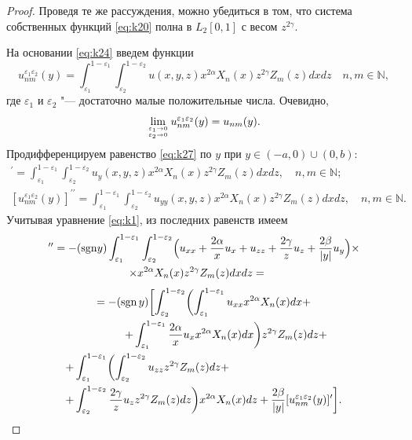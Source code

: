 \begin{proof}
	Проведя те же рассуждения, можно убедиться в том, что система собственных функций \eqref{eq:k20} полна в $L_2[0,1]$ с весом $z^{2\gamma}.$

	На основании \eqref{eq:k24} введем функции
\begin{equation}
u_{nm}^{\varepsilon_1\varepsilon_2}(y)=\int_{\varepsilon_1}^{1-\varepsilon_1}{\int_{\varepsilon_2 }^{1-\varepsilon_2}{u(x,y,z)x^{2\alpha}X_n(x)z^{2\gamma}Z_m(z)dxdz}} \quad n,m \in \mathbb N,
\label{eq:k27}
\end{equation}
где $\varepsilon_1$ и $\varepsilon_2$ "--- достаточно малые положительные числа.
Очевидно, 
\begin{equation}
\lim\limits_{\varepsilon_1\to0 \atop \varepsilon_2\to0}u_{nm}^{\varepsilon_1\varepsilon_2}(y)=u_{nm}(y).
\label{eq:k28}
\end{equation}
Продифференцируем равенство \eqref{eq:k27} по $y$ при $y\in(-a,0)\cup(0,b)$:
\begin{gather*}
[u_{nm}^{\varepsilon_1\varepsilon_2}(y)]^\prime=\int_{\varepsilon_1}^{1-\varepsilon_1} {\int_{\varepsilon_2}^{1-\varepsilon_2}{u_y(x,y,z)x^{2\alpha}X_n(x)z^{2\gamma}Z_m(z)dxdz}}, \quad n,m \in \mathbb N;
\\
[u_{nm}^{\varepsilon_1\varepsilon_2}(y)]^{\prime\prime}=\int_{\varepsilon_1}^{1-\varepsilon_1} {\int_{\varepsilon_2}^{1-\varepsilon_2}{u_{yy}(x,y,z)x^{2\alpha}X_n(x)z^{2\gamma}Z_m(z)dxdz}}, \quad n,m \in \mathbb N.
\end{gather*}
Учитывая уравнение \eqref{eq:k1}, из последних равенств имеем
\begin{multline}
[u_{nm}^{\varepsilon_1\varepsilon_2}(y)]^{\prime\prime}=
-({\rm sgn}y)
\int_{\varepsilon_1}^{1-\varepsilon_1}
\int_{\varepsilon_2}^{1-\varepsilon_2}
\Bigl(u_{xx}+\frac{2\alpha}{x}u_x+u_{zz}+\frac{2\gamma}{z}u_z+\frac{2\beta}{|y|}u_y\Bigr)\times
\\ 
\times x^{2\alpha}X_n(x)z^{2\gamma}Z_m(z)dxdz=~~~~
\end{multline} \newpage
\begin{multline}
=-(\mathop{\rm sgn}y)
\biggl[ \int_{\varepsilon_2}^{1-\varepsilon_2}
\biggl(\int_{\varepsilon_1}^{1-\varepsilon_1}u_{xx}x^{2\alpha}X_n(x)dx+
\\
\hfill
+ \int_{\varepsilon_1}^{1-\varepsilon_1}
\frac{2\alpha}{x}u_x x^{2\alpha}X_n(x)dx\biggr) z^{2\gamma} Z_m(z)dz+~~~~
\\
+\int_{\varepsilon_1}^{1-\varepsilon_1}
\biggl(\int_{\varepsilon_2}^{1-\varepsilon_2}
u_{zz}z^{2\gamma}Z_m(z)dz+ \hfill 
\\
+ \int_{\varepsilon_2}^{1-\varepsilon_2} 
\frac{2\gamma}{z}u_z z^{2\gamma}Z_m(z)dz\biggr)x^{2\alpha}X_n(x)dz+
\frac{2\beta}{|y|}[u_{nm}^{\varepsilon_1\varepsilon_2}(y)]^\prime\biggr].
\label{eq:k29}
\end{multline}




\end{proof}
